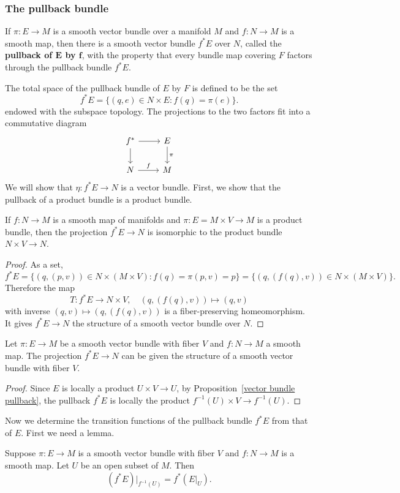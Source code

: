 \subsubsection{The pullback bundle}
If $\pi:E\to M$ is a smooth vector bundle over a manifold $M$ and $f:N\to M$ is a smooth map, then there is a smooth vector bundle $f^*E$ over $N$, called the \textbf{pullback 
of $\bm{E}$ by $\bm{f}$}, with the property that every bundle map covering $F$ factors through the pullback bundle $f^*E$.\par
The total space of the pullback bundle of $E$ by $F$ is defined to be the set
\[f^*E=\{(q,e)\in N\times E:f(q)=\pi(e)\}.\]
endowed with the subspace topology. The projections to the two factors fit into a commutative diagram
\[\begin{tikzcd}
f^*\ar[r]\ar[d]&E\ar[d,"\pi"]&\\
N\ar[r,"f"]&M
\end{tikzcd}\]
We will show that $\eta:f^*E\to N$ is a vector bundle. First, we show that the pullback of a product bundle is a product bundle.
\begin{proposition}\label{vector bundle pullback}
If $f:N\to M$ is a smooth map of manifolds and $\pi:E=M\times V\to M$ is a product bundle, then the projection $f^*E\to N$ is isomorphic to the product bundle 
$N\times V\to N$.
\end{proposition}
\begin{proof}
As a set,
\[f^*E=\{(q,(p,v))\in N\times(M\times V):f(q)=\pi(p,v)=p\}=\{(q,(f(q),v))\in N\times(M\times V)\}.\]
Therefore the map
\[T:f^*E\to N\times V,\quad (q,(f(q),v))\mapsto(q,v)\]
with inverse $(q,v)\mapsto(q,(f(q),v))$ is a fiber-preserving homeomorphism. It gives $f^*E\to N$ the structure of a smooth vector bundle over $N$.
\end{proof}
\begin{corollary}
Let $\pi:E\to M$ be a smooth vector bundle with fiber $V$ and $f:N\to M$ a smooth map. The projection $f^*E\to N$ can be given the structure of a smooth vector bundle 
with fiber $V$.
\end{corollary}
\begin{proof}
Since $E$ is locally a product $U\times V\to U$, by Proposition~\ref{vector bundle pullback}, the pullback $f^*E$ is locally the product $f^{-1}(U)\times V\to f^{-1}(U)$.
\end{proof}
Now we determine the transition functions of the pullback bundle $f^*E$ from that of $E$. First we need a lemma.
\begin{lemma}
Suppose $\pi:E\to M$ is a smooth vector bundle with fiber $V$ and $f:N\to M$ is a smooth map. Let $U$ be an open subset of $M$. Then
\[(f^*E)|_{f^{-1}(U)}=f^*(E|_U).\]
\end{lemma}
